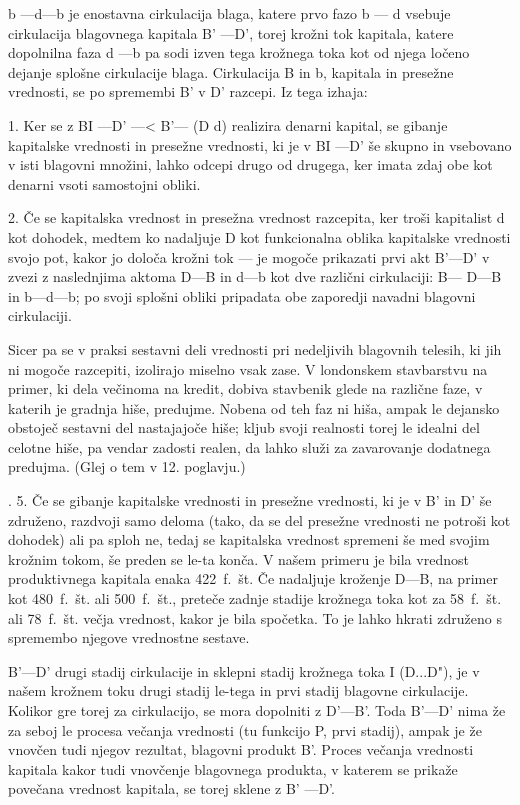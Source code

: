 \documentclass[kapital_02.tex]{subfiles}
\begin{document}
b —d—b je enostavna cirkulacija blaga, katere prvo fazo b — d vsebuje cirkulacija blagovnega kapitala B' —D', torej krožni tok kapitala, katere dopolnilna faza d —b pa sodi izven tega krožnega toka kot od njega ločeno dejanje splošne cirkulacije blaga. Cirkulacija B in b, kapitala in presežne vrednosti, se po spremembi B' v D' razcepi. Iz tega izhaja:

1. Ker se z BI —D' —< B'— (D d) realizira denarni kapital, se gibanje kapitalske vrednosti in presežne vrednosti, ki je v BI —D' še skupno in vsebovano v isti blagovni množini, lahko odcepi drugo od drugega, ker imata zdaj obe kot denarni vsoti samostojni obliki.

2. Če se kapitalska vrednost in presežna vrednost razcepita, ker troši kapitalist d kot dohodek, medtem ko nadaljuje D kot funkcionalna oblika kapitalske vrednosti svojo pot, kakor jo določa krožni tok — je mogoče prikazati prvi akt B'—D' v zvezi z naslednjima aktoma D—B in d—b kot dve različni cirkulaciji: B— D—B in b—d—b; po svoji splošni obliki pripadata obe zaporedji navadni blagovni cirkulaciji.

Sicer pa se v praksi sestavni deli vrednosti pri nedeljivih blagovnih telesih, ki jih ni mogoče razcepiti, izolirajo miselno vsak zase. V londonskem stavbarstvu na primer, ki dela večinoma na kredit, dobiva stavbenik glede na različne faze, v katerih je gradnja hiše, predujme. Nobena od teh faz ni hiša, ampak le dejansko obstoječ sestavni del nastajajoče hiše; kljub svoji realnosti torej le idealni del celotne hiše, pa vendar zadosti realen, da lahko služi za zavarovanje dodatnega predujma. (Glej o tem v 12. poglavju.)

. 5. Če se gibanje kapitalske vrednosti in presežne vrednosti, ki je v B' in D' še združeno, razdvoji samo deloma (tako, da se del presežne vrednosti ne potroši kot dohodek) ali pa sploh ne, tedaj se kapitalska vrednost spremeni še med svojim krožnim tokom, še preden se le-ta konča. V našem primeru je bila vrednost produktivnega kapitala enaka 422~f.~št. Če nadaljuje kroženje D—B, na primer kot 480~f.~št. ali 500~f.~št., preteče zadnje stadije krožnega toka kot za 58~f.~št. ali 78~f.~št. večja vrednost, kakor je bila spočetka. To je lahko hkrati združeno s spremembo njegove vrednostne sestave.

B'—D' drugi stadij cirkulacije in sklepni stadij krožnega toka I (D...D"), je v našem krožnem toku drugi stadij le-tega in prvi stadij blagovne cirkulacije. Kolikor gre torej za cirkulacijo, se mora dopolniti z D'—B'. Toda B'—D' nima že za seboj le procesa večanja vrednosti (tu funkcijo P, prvi stadij), ampak je že vnovčen tudi njegov rezultat, blagovni produkt B'. Proces večanja vrednosti kapitala kakor tudi vnovčenje blagovnega produkta, v katerem se prikaže povečana vrednost kapitala, se torej sklene z B' —D'.
\end{document}
